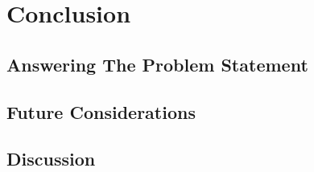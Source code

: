 \chapter{Conclusion}\label{ch:conclusion}

\section{Answering The Problem Statement}

\section{Future Considerations}

\section{Discussion}